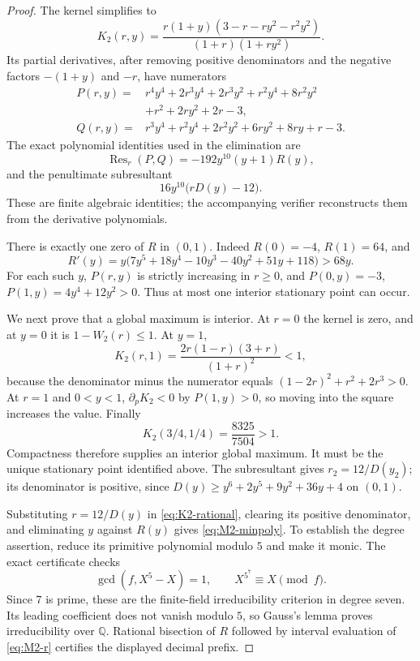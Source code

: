 \documentclass[11pt]{article}
\numberwithin{equation}{section}
\theoremstyle{definition}
\theoremstyle{remark}
\begin{document}
\begin{proof}
The kernel simplifies to
\begin{equation}\label{eq:K2-rational}
 K_2(r,y)=\frac{r(1+y)(3-r-ry^2-r^2y^2)}{(1+r)(1+ry^2)}.
\end{equation}
Its partial derivatives, after removing positive denominators and
the negative factors $-(1+y)$ and $-r$, have numerators
\begin{align*}
 P(r,y)={}&r^4y^4+2r^3y^4+2r^3y^2+r^2y^4+8r^2y^2\\
          &+r^2+2ry^2+2r-3,\\
 Q(r,y)={}&r^3y^4+r^2y^4+2r^2y^2+6ry^2+8ry+r-3.
\end{align*}
The exact polynomial identities used in the elimination are
\begin{equation}\label{eq:M2-resultant}
 \operatorname{Res}_r(P,Q)=-192y^{10}(y+1)R(y),
\end{equation}
and the penultimate subresultant
\begin{equation}\label{eq:M2-subresultant}
 16y^{10}\bigl(rD(y)-12\bigr).
\end{equation}
These are finite algebraic identities; the accompanying verifier
reconstructs them from the derivative polynomials.

There is exactly one zero of $R$ in $(0,1)$. Indeed $R(0)=-4$,
$R(1)=64$, and
\[
 R'(y)=y\bigl(7y^5+18y^4-10y^3-40y^2+51y+118\bigr)>68y.
\]
For each such $y$, $P(r,y)$ is strictly increasing in $r\ge0$,
and $P(0,y)=-3$, $P(1,y)=4y^4+12y^2>0$. Thus at most one
interior stationary point can occur.

We next prove that a global maximum is interior. At $r=0$ the
kernel is zero, and at $y=0$ it is $1-W_2(r)\le1$. At $y=1$,
\[
 K_2(r,1)=\frac{2r(1-r)(3+r)}{(1+r)^2}<1,
\]
because the denominator minus the numerator equals
$(1-2r)^2+r^2+2r^3>0$. At $r=1$ and $0<y<1$,
$\partial_pK_2<0$ by $P(1,y)>0$, so moving into the square
increases the value. Finally
\[
 K_2(3/4,1/4)=\frac{8325}{7504}>1.
\]
Compactness therefore supplies an interior global maximum.
It must be the unique stationary point identified above.
The subresultant gives $r_2=12/D(y_2)$; its denominator is positive,
since $D(y)\ge y^6+2y^5+9y^2+36y+4$ on $(0,1)$.

Substituting $r=12/D(y)$ in \eqref{eq:K2-rational}, clearing its
positive denominator, and eliminating $y$ against $R(y)$ gives
\eqref{eq:M2-minpoly}. To establish the degree assertion, reduce its
primitive polynomial modulo $5$ and make it monic. The exact certificate
checks
\[
 \gcd(f,X^5-X)=1,\qquad X^{5^7}\equiv X\pmod f.
\]
Since $7$ is prime, these are the finite-field irreducibility criterion
in degree seven. Its leading coefficient does not vanish modulo $5$,
so Gauss's lemma proves irreducibility over $\mathbb Q$.
Rational bisection of $R$ followed by interval evaluation of
\eqref{eq:M2-r} certifies the displayed decimal prefix.
\end{proof}
\end{document}

